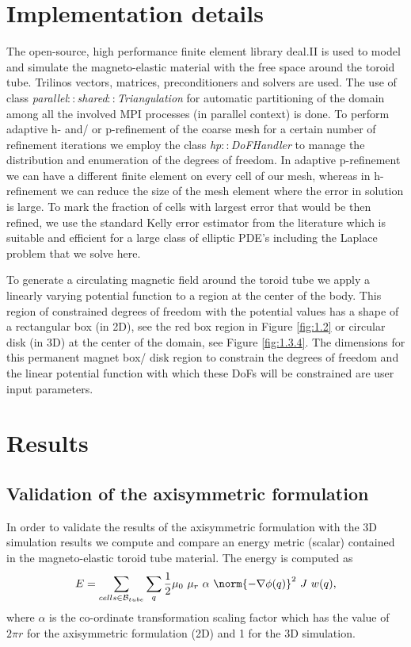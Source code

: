 \documentclass[11pt,a4paper,final]{article}
\begin{document}
\section{Implementation details}
The open-source, high performance finite element library deal.II \cite{BangerthHartmannKanschat2007,dealII90} is used to model and simulate the magneto-elastic material with the free space around the toroid tube. Trilinos \cite{trilinos} vectors, matrices, preconditioners and solvers are used. The use of class  \emph{parallel$::$shared$::$Triangulation} for automatic partitioning of the domain among all the involved MPI processes (in parallel context) is done. To perform adaptive h- and/ or p-refinement of the coarse mesh for a certain number of refinement iterations we employ the class \emph{hp$::$DoFHandler} to manage the distribution and enumeration of the degrees of freedom. In adaptive p-refinement we can have a different finite element on every cell of our mesh, whereas in h-refinement we can reduce the size of the mesh element where the error in solution is large. To mark the fraction of cells with largest error that would be then refined, we use the standard Kelly error estimator from the literature which is suitable and efficient for a large class of elliptic PDE's including the Laplace problem that we solve here. \par 
To generate a circulating magnetic field around the toroid tube we apply a linearly varying potential function to a region at the center of the body. This region of constrained degrees of freedom with the potential values has a shape of a rectangular box (in 2D), see the red box region in Figure \eqref{fig:1.2} or circular disk (in 3D) at the center of the domain, see Figure \eqref{fig:1.3.4}. The dimensions for this permanent magnet box/ disk region to constrain the degrees of freedom and the linear potential function with which these DoFs will be constrained are user input parameters. \par 

\section{Results}
\subsection{Validation of the axisymmetric formulation}
In order to validate the results of the axisymmetric formulation with the 3D simulation results we compute and compare an energy metric (scalar) contained in the magneto-elastic toroid tube material. The energy is computed as
\begin{equation}
E = \sum\limits_{cells \in \mathcal{B}_{tube}} \sum\limits_{q} \frac{1}{2} \mu_0 \ \mu_r \ \alpha \ \norm{-\nabla \phi(q)}^2 \ J \ w(q),
\end{equation}
where $\alpha$ is the co-ordinate transformation scaling factor which has the value of $2 \pi r$ for the axisymmetric formulation (2D) and 1 for the 3D simulation.\par 
\end{document}
